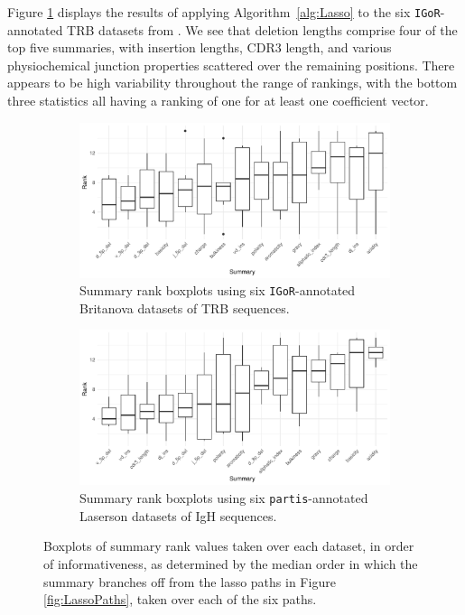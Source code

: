 \documentclass{article}
\newcommand{\partis}{\texttt{partis}}
\newcommand{\igor}{\texttt{IGoR}}
\begin{document}
Figure \ref{fig:IgorLassoScores} displays the results of applying Algorithm~\ref{alg:Lasso} to the six \igor-annotated TRB datasets from \cite{Britanova2016-iw}.
We see that deletion lengths comprise four of the top five summaries, with insertion lengths, CDR3 length, and various physiochemical junction properties scattered over the remaining positions.
There appears to be high variability throughout the range of rankings, with the bottom three statistics all having a ranking of one for at least one coefficient vector.
\begin{figure}
        \begin{subfigure}{\linewidth}
    	\includegraphics[width=\linewidth]{Figures/Lasso/igor_lasso_scores.pdf}
		\caption{Summary rank boxplots using six \igor-annotated Britanova datasets of TRB sequences.}
		\label{fig:IgorLassoScores}
    \end{subfigure}
    \begin{subfigure}{\linewidth}
    	\includegraphics[width=\linewidth]{Figures/Lasso/partis_lasso_scores.pdf}
		\caption{Summary rank boxplots using six \partis-annotated Laserson datasets of IgH sequences.}
		\label{fig:PartisLassoScores}
    \end{subfigure}
    \caption{Boxplots of summary rank values taken over each dataset, in order of informativeness, as determined by the median order in which the summary branches off from the lasso paths in Figure \ref{fig:LassoPaths}, taken over each of the six paths.}
    \label{fig:LassoScores}
\end{figure}
\end{document}
